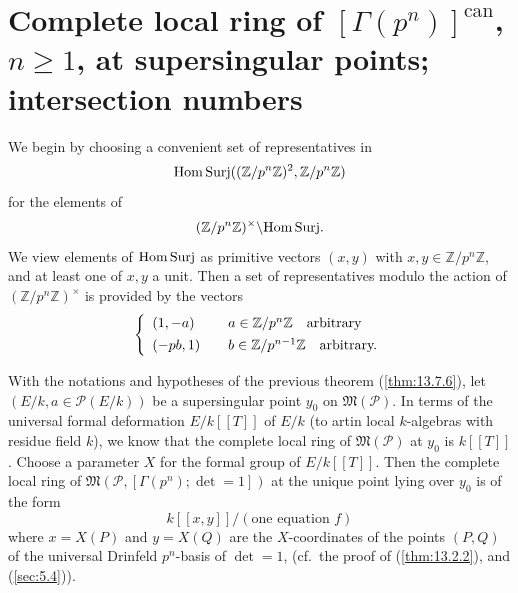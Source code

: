 \section[Complete local ring of {$[\Gamma(p^n)]^{\mathrm{can}}$} at supersingular points]{Complete local ring of \texorpdfstring{$[\Gamma(p^n)]^{\mathrm{can}}$}{[Gamma(p^n)]^can}, $n \ge 1$, at supersingular points; intersection numbers}
\label{sec:13.8}

\kmitem\label{item:13.8.1}We begin by choosing a convenient set of representatives in
\[
\mathrm{Hom\,Surj}((\mathbb{Z}/p^n\mathbb{Z})^2, \mathbb{Z}/p^n\mathbb{Z})
\]
for the elements of
\[
(\mathbb{Z}/p^n\mathbb{Z})^\times \backslash \mathrm{Hom\,Surj} .
\]
We view elements of $\mathrm{Hom\,Surj}$ as primitive vectors $(x,y)$ with $x, y \in \mathbb{Z}/p^n\mathbb{Z}$, and at least one of $x, y$ a unit. Then a set of representatives modulo the action of $(\mathbb{Z}/p^n\mathbb{Z})^\times$ is provided by the vectors
\[
\left\{\begin{array}{l@{\qquad}l}
(1, -a) & a \in \mathbb{Z}/p^n\mathbb{Z} \quad \text{arbitrary} \\[4pt]
(-pb, 1) & b \in \mathbb{Z}/p^{n-1}\mathbb{Z} \quad \text{arbitrary.}
\end{array}\right.
\]

\kmitem\label{item:13.8.2}With the notations and hypotheses of the previous theorem (\ref{thm:13.7.6}), let $(E/k, a \in \mathcal{P}(E/k))$ be a supersingular point $y_0$ on $\mathfrak{M}(\mathcal{P})$. In terms of the universal formal deformation $E/k[[T]]$ of $E/k$ (to artin local $k$-algebras with residue field $k$), we know that the complete local ring of $\mathfrak{M}(\mathcal{P})$ at $y_0$ is $k[[T]]$. Choose a parameter $X$ for the formal group of $E/k[[T]]$. Then the complete local ring of $\mathfrak{M}(\mathcal{P}, [\Gamma(p^n); \det = 1])$ at the unique point lying over $y_0$ is of the form
\[
k[[x,y]]/(\text{one equation } f)
\]
where $x = X(P)$ and $y = X(Q)$ are the $X$-coordinates of the points $(P,Q)$ of the universal Drinfeld $p^n$-basis of $\det = 1$, (cf.\ the proof of (\ref{thm:13.2.2}), and (\ref{sec:5.4})).

